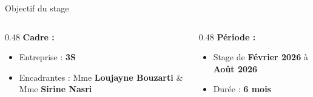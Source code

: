 \documentclass[aspectratio=169]{beamer}
\begin{document}
\begin{frame}{Objectif du stage}
  \vspace{0.5cm}
  \begin{columns}[T]
    \begin{column}{0.48\textwidth}
      \textbf{Cadre :}
      \begin{itemize}
        \item Entreprise : \textbf{3S}
        \item Encadrantes : Mme \textbf{Loujayne Bouzarti} \& Mme \textbf{Sirine Nasri}
      \end{itemize}
    \end{column}
    \begin{column}{0.48\textwidth}
      \textbf{Période :}
      \begin{itemize}
        \item Stage de \textbf{Février 2026} à \textbf{Août 2026}
        \item Durée : \textbf{6 mois}
      \end{itemize}
    \end{column}
  \end{columns}

\end{frame}
\end{document}
